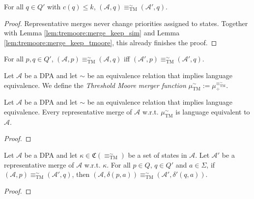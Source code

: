 \begin{lem}
	For all $q \in Q'$ with $c(q) \leq k$, $(\mathcal{A}, q) \equiv^\sim_\text{TM} (\mathcal{A}', q)$.
\end{lem}

\begin{proof}
	Representative merges never change priorities assigned to states. Together with Lemma \ref{lem:tremoore:merge_keep_sim} and Lemma \ref{lem:tremoore:merge_keep_tmoore}, this already finishes the proof.
\end{proof}

\begin{cor}
	For all $p, q \in Q'$, $(\mathcal{A}, p) \equiv^\sim_\text{TM} (\mathcal{A}, q)$ iff $(\mathcal{A}', p) \equiv^\sim_\text{TM} (\mathcal{A}', q)$.
\end{cor}

\vspace{10pt}

\begin{defn}
	Let $\mathcal{A}$ be a DPA and let $\sim$ be an equivalence relation that implies language equivalence. We define the \emph{Threshold Moore merger function} $\mu_\text{TM}^\sim := \mu_\div^{\equiv^\sim_\text{TM}}$.
\end{defn}

\begin{theorem}
	Let $\mathcal{A}$ be a DPA and let $\sim$ be an equivalence relation that implies language equivalence. Every representative merge of $\mathcal{A}$ w.r.t. $\mu_\text{TM}^\sim$ is language equivalent to $\mathcal{A}$.
\end{theorem}

\begin{proof}
\end{proof}

\newpage

\begin{lem}
	Let $\mathcal{A}$ be a DPA and let $\kappa \in \mathfrak{C}(\equiv^\sim_\text{TM})$ be a set of states in $\mathcal{A}$. Let $\mathcal{A}'$ be a representative merge of $\mathcal{A}$ w.r.t. $\kappa$. For all $p \in Q$, $q \in Q'$ and $a \in \Sigma$, if $(\mathcal{A}, p) \equiv^\sim_\text{TM} (\mathcal{A}', q)$, then $(\mathcal{A}, \delta(p, a)) \equiv^\sim_\text{TM} (\mathcal{A}', \delta'(q, a))$.
\end{lem}

\begin{proof}
\end{proof}


